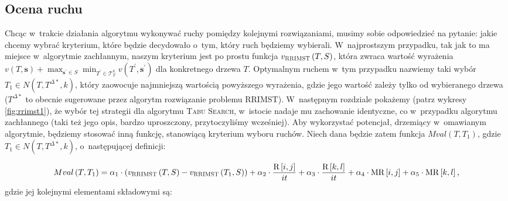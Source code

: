 \subsection{Ocena ruchu}



Chcąc w~trakcie działania algorytmu wykonywać ruchy pomiędzy kolejnymi rozwiązaniami, musimy sobie odpowiedzieć na pytanie: jakie chcemy wybrać kryterium, które będzie decydowało o~tym, który ruch będziemy wybierali.
W~najprostszym przypadku, tak jak to ma miejsce w~algorytmie zachłannym, naszym kryterium jest po prostu funkcja $v_{\textsc{RRIMST}} \left( T, S \right)$, która zwraca wartość wyrażenia $v \left( T, \textbf{s} \right) + \max_{\textbf{s}^{\prime} \in S} \min_{T^{\prime} \in \mathcal{T}^{k}_{T}} v \left( T^{\prime}, \textbf{s}^{\prime} \right)$ dla konkretnego drzewa $T$.
Optymalnym ruchem w~tym przypadku nazwiemy taki wybór $T_{1} \in N \left( T, T^{\Delta\ast}, k \right)$, który zaowocuje najmniejszą wartością powyższego wyrażenia, gdzie jego wartość zależy tylko od wybieranego drzewa ($T^{\Delta\ast}$ to obecnie sugerowane przez algorytm rozwiązanie problemu \textsc{RRIMST}).
W~następnym rozdziale pokażemy (patrz wykresy \ref{fig:rrimst1}), że wybór tej strategii dla algorytmu \textsc{Tabu Search}, w~istocie nadaje mu zachowanie identyczne, co w~przypadku algorytmu zachłannego (taki też jego opis, bardzo uproszczony, przytoczyliśmy wcześniej).
Aby wykorzystać potencjał, drzemiący w~omawianym algorytmie, będziemy stosować inną funkcję, stanowiącą kryterium wyboru ruchów.
Niech dana będzie zatem funkcja $Mval \left( T, T_{1} \right)$, gdzie $T_{1} \in N \left( T, T^{\Delta\ast}, k \right)$, o~następującej definicji:

\begin{equation}\label{eq:moveValue}
	Mval \left( T, T_{1} \right) = \alpha_{1} \cdot \left( v_{\textsc{RRIMST}} \left( T, S \right) - v_{\textsc{RRIMST}} \left( T_{1}, S \right) \right) + \alpha_{2} \cdot \frac{\text{R} \left[ i, j \right]}{it} + \alpha_{3} \cdot \frac{\text{R} \left[ k, l \right]}{it} + \alpha_{4} \cdot \text{MR} \left[ i, j \right] + \alpha_{5} \cdot \text{MR} \left[ k, l \right]\text{,}
\end{equation}
gdzie jej kolejnymi elementami składowymi są:

